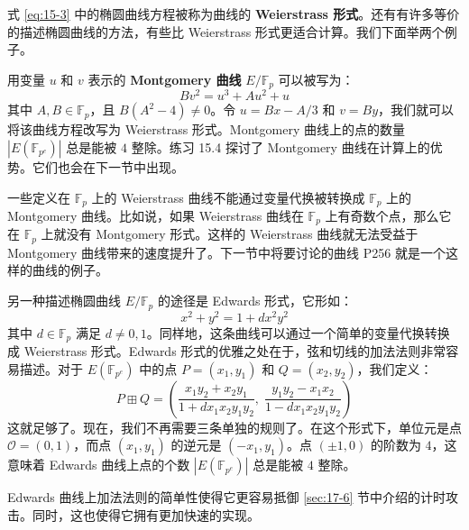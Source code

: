 式 \ref{eq:15-3} 中的椭圆曲线方程被称为曲线的 \textbf{Weierstrass 形式}。还有有许多等价的描述椭圆曲线的方法，有些比 Weierstrass 形式更适合计算。我们下面举两个例子。

\begin{snote}[Montgomery 曲线。]
用变量 $u$ 和 $v$ 表示的 \textbf{Montgomery 曲线} $E/\mathbb{F}_p$ 可以被写为：
\[
Bv^2=u^3+Au^2+u
\]
其中 $A,B\in\mathbb{F}_p$，且 $B(A^2-4)\neq0$。令 $u=Bx-{A/3}$ 和 $v=By$，我们就可以将该曲线方程改写为 Weierstrass 形式。Montgomery 曲线上的点的数量 $|E(\mathbb{F}_{p^e})|$ 总是能被 $4$ 整除。练习 15.4 探讨了 Montgomery 曲线在计算上的优势。它们也会在下一节中出现。

一些定义在 $\mathbb{F}_p$ 上的 Weierstrass 曲线不能通过变量代换被转换成 $\mathbb{F}_p$ 上的 Montgomery 曲线。比如说，如果 Weierstrass 曲线在 $\mathbb{F}_p$ 上有奇数个点，那么它在 $\mathbb{F}_p$ 上就没有 Montgomery 形式。这样的 Weierstrass 曲线就无法受益于 Montgomery 曲线带来的速度提升了。下一节中将要讨论的曲线 P256 就是一个这样的曲线的例子。
\end{snote}

\begin{snote}[Edwards 曲线。]
另一种描述椭圆曲线 $E/\mathbb{F}_p$ 的途径是 Edwards 形式，它形如：
\[
x^2+y^2=1+dx^2y^2
\]
其中 $d\in\mathbb{F}_p$ 满足 $d\neq0,1$。同样地，这条曲线可以通过一个简单的变量代换转换成 Weierstrass 形式。Edwards 形式的优雅之处在于，弦和切线的加法法则非常容易描述。对于 $E(\mathbb{F}_{p^e})$ 中的点 $P=(x_1,y_1)$ 和 $Q=(x_2,y_2)$，我们定义：
\[
P\boxplus Q=\left(\frac{x_1y_2+x_2y_1}{1+dx_1x_2y_1y_2},\;\frac{y_1y_2-x_1x_2}{1-dx_1x_2y_1y_2}\right)
\]
这就足够了。现在，我们不再需要三条单独的规则了。在这个形式下，单位元是点 $\mathcal{O}=(0,1)$，而点 $(x_1,y_1)$ 的逆元是 $(-x_1,y_1)$。点 $(\pm 1,0)$ 的阶数为 $4$，这意味着 Edwards 曲线上点的个数 $|E(\mathbb{F}_{p^e})|$ 总是能被 $4$ 整除。

Edwards 曲线上加法法则的简单性使得它更容易抵御 \ref{sec:17-6} 节中介绍的计时攻击。同时，这也使得它拥有更加快速的实现。
\end{snote}